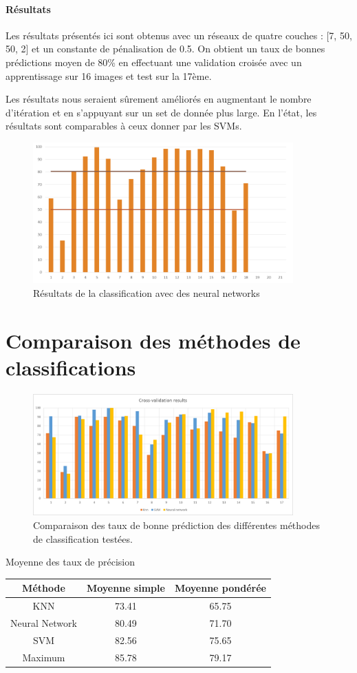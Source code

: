 \documentclass[a4paper,10pt]{report}
\begin{document}
\paragraph{Résultats}
Les résultats présentés ici sont obtenus avec un réseaux de quatre couches : [7, 50, 50, 2] et un constante de pénalisation de 0.5.
On obtient un taux de bonnes prédictions moyen de 80\% en effectuant une validation croisée avec un apprentissage sur 16 images et test sur la 17ème. 

Les résultats nous seraient sûrement améliorés en augmentant le nombre d'itération et en s'appuyant sur un set de donnée plus large. En l'état, les résultats sont comparables à ceux donner par les SVMs.
\begin{figure}[htbp]
  \caption{Résultats de la classification avec des neural networks}
  \centering
  \includegraphics[width=10cm]{nn_results.png}
\end{figure}

\section{Comparaison des méthodes de classifications}

\begin{figure}[htbp]
  \caption{Comparaison des taux de bonne prédiction des différentes méthodes de classification testées.}
  \centering
  \includegraphics[width=10cm]{Compared_CV.png}
\end{figure}

\begin{center}
Moyenne des taux de précision\\

\begin{tabular}{|c|c|c|}  
  \hline
  Méthode & Moyenne simple & Moyenne pondérée\\
  \hline
  KNN & 73.41 & 65.75\\
  Neural Network & 80.49 & 71.70\\  
  SVM & 82.56 & 75.65\\
  \hline
  Maximum & 85.78 & 79.17\\
  \hline
\end{tabular}
\end{center}
\end{document}
